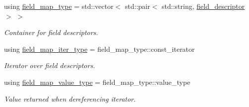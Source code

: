 \begin{DoxyCompactItemize}
using \hyperlink{classsession_a89f9e4e228170509957350abccad4ff0}{field\+\_\+map\+\_\+type} = std\+::vector$<$ std\+::pair$<$ std\+::string, \hyperlink{structsession_1_1field__descriptor}{field\+\_\+descriptor} $>$ $>$
\begin{DoxyCompactList}\small\item\em Container for field descriptors. \end{DoxyCompactList}\item 
using \hyperlink{classsession_a1124fe81d0a0c740c46f101818980aff}{field\+\_\+map\+\_\+iter\+\_\+type} = field\+\_\+map\+\_\+type\+::const\+\_\+iterator
\begin{DoxyCompactList}\small\item\em Iterator over field descriptors. \end{DoxyCompactList}\item 
using \hyperlink{classsession_a8cca62aada351eadfa6976355db84882}{field\+\_\+map\+\_\+value\+\_\+type} = field\+\_\+map\+\_\+type\+::value\+\_\+type
\begin{DoxyCompactList}\small\item\em Value returned when dereferencing iterator. \end{DoxyCompactList}\end{DoxyCompactItemize}
